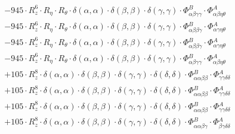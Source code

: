 \documentclass{article}
\begin{document}
\begin{subequations}
\begin{gather}
\begin{array}{c}
 \\[0.2em] 		 - 945 \cdot R_{z}^{6} \cdot R_{\eta{}} \cdot R_{\theta{}} \cdot \delta{}\left(\alpha{}, \alpha{}\right) \cdot \delta{}\left(\beta{}, \beta{}\right) \cdot \delta{}\left(\gamma{}, \gamma{}\right) \cdot \Phi{}^{B}_{\alpha{}\beta{}\gamma{}\gamma{}} \cdot \Phi{}^{A}_{\alpha{}\beta{}\eta{}\theta{}} 
 \\[0.2em] 		 - 945 \cdot R_{z}^{6} \cdot R_{\eta{}} \cdot R_{\theta{}} \cdot \delta{}\left(\alpha{}, \alpha{}\right) \cdot \delta{}\left(\beta{}, \beta{}\right) \cdot \delta{}\left(\gamma{}, \gamma{}\right) \cdot \Phi{}^{B}_{\alpha{}\beta{}\beta{}\gamma{}} \cdot \Phi{}^{A}_{\alpha{}\gamma{}\eta{}\theta{}} 
 \\[0.2em] 		 - 945 \cdot R_{z}^{6} \cdot R_{\eta{}} \cdot R_{\theta{}} \cdot \delta{}\left(\alpha{}, \alpha{}\right) \cdot \delta{}\left(\beta{}, \beta{}\right) \cdot \delta{}\left(\gamma{}, \gamma{}\right) \cdot \Phi{}^{B}_{\alpha{}\beta{}\beta{}\gamma{}} \cdot \Phi{}^{A}_{\alpha{}\gamma{}\eta{}\theta{}} 
 \\[0.2em] 		 - 945 \cdot R_{z}^{6} \cdot R_{\eta{}} \cdot R_{\theta{}} \cdot \delta{}\left(\alpha{}, \alpha{}\right) \cdot \delta{}\left(\beta{}, \beta{}\right) \cdot \delta{}\left(\gamma{}, \gamma{}\right) \cdot \Phi{}^{B}_{\alpha{}\beta{}\gamma{}\gamma{}} \cdot \Phi{}^{A}_{\alpha{}\beta{}\eta{}\theta{}} 
 \\[0.2em] 		 + 105 \cdot R_{z}^{8} \cdot \delta{}\left(\alpha{}, \alpha{}\right) \cdot \delta{}\left(\beta{}, \beta{}\right) \cdot \delta{}\left(\gamma{}, \gamma{}\right) \cdot \delta{}\left(\delta{}, \delta{}\right) \cdot \Phi{}^{B}_{\alpha{}\alpha{}\beta{}\beta{}} \cdot \Phi{}^{A}_{\gamma{}\gamma{}\delta{}\delta{}} 
 \\[0.2em] 		 + 105 \cdot R_{z}^{8} \cdot \delta{}\left(\alpha{}, \alpha{}\right) \cdot \delta{}\left(\beta{}, \beta{}\right) \cdot \delta{}\left(\gamma{}, \gamma{}\right) \cdot \delta{}\left(\delta{}, \delta{}\right) \cdot \Phi{}^{B}_{\alpha{}\alpha{}\beta{}\beta{}} \cdot \Phi{}^{A}_{\gamma{}\gamma{}\delta{}\delta{}} 
 \\[0.2em] 		 + 105 \cdot R_{z}^{8} \cdot \delta{}\left(\alpha{}, \alpha{}\right) \cdot \delta{}\left(\beta{}, \beta{}\right) \cdot \delta{}\left(\gamma{}, \gamma{}\right) \cdot \delta{}\left(\delta{}, \delta{}\right) \cdot \Phi{}^{B}_{\alpha{}\alpha{}\beta{}\beta{}} \cdot \Phi{}^{A}_{\gamma{}\gamma{}\delta{}\delta{}} 
 \\[0.2em] 		 + 105 \cdot R_{z}^{8} \cdot \delta{}\left(\alpha{}, \alpha{}\right) \cdot \delta{}\left(\beta{}, \beta{}\right) \cdot \delta{}\left(\gamma{}, \gamma{}\right) \cdot \delta{}\left(\delta{}, \delta{}\right) \cdot \Phi{}^{B}_{\alpha{}\alpha{}\beta{}\gamma{}} \cdot \Phi{}^{A}_{\beta{}\gamma{}\delta{}\delta{}} 

\end{array}
\end{gather}
\end{subequations}
\end{document}
